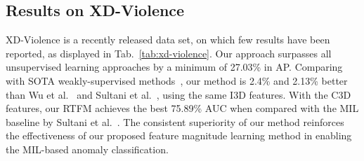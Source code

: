 \documentclass[10pt,twocolumn,letterpaper]{article}
\begin{document}
\subsection{Results on XD-Violence}

XD-Violence is a recently released data set, on which few results have been reported, as displayed in Tab.~\ref{tab:xd-violence}. Our approach surpasses all unsupervised learning approaches by a minimum of 27.03\% in AP. 
Comparing with SOTA weakly-supervised methods~\cite{Wu2020not,sultani2018real}, our method is 2.4\% and 2.13\% better than Wu et al.~\cite{Wu2020not} and Sultani et al.~\cite{sultani2018real}, using the same I3D features. With the C3D features, our RTFM achieves the best 75.89\% AUC when compared with the MIL baseline by Sultani et al.~\cite{sultani2018real}. The consistent superiority of our method reinforces the effectiveness of our proposed feature magnitude learning method in enabling the MIL-based anomaly classification. 


\begin{table}[htbp]
\centering
{}
\caption{Comparison of AP performance with other SOTA un/weakly-supervised methods on XD-Violence. * indicates we retrain the method in~\cite{sultani2018real} using I3D features. Best result in \textcolor{red}{\textbf{red}} and second best in \textcolor{blue}{\textbf{blue}}.}
\label{tab:xd-violence}
\end{table}
\end{document}
